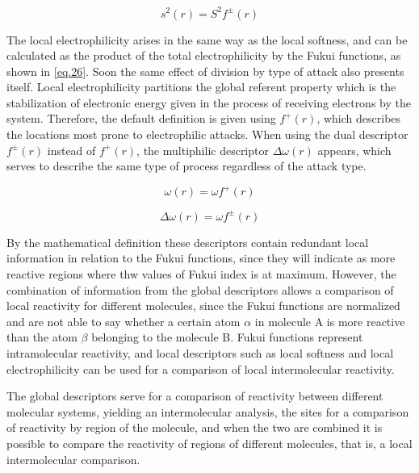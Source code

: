 \documentclass[a4paper,11pt]{refart}
\begin{document}
	\begin{equation}
	s^{2}(r) = S^2f^{\pm}(r)
	\label{eq.25}
	\end{equation}

	The local electrophilicity arises in the same way as the local softness, and can be calculated as the product of the total electrophilicity by the Fukui functions\cite{noorizadeh2013evaluation}, as shown in \autoref{eq.26}. Soon the same effect of division by type of attack also presents itself. Local electrophilicity partitions the global referent property which is the stabilization of electronic energy given in the process of receiving electrons by the system. Therefore, the default definition is given using $f^+(r)$, which describes the locations most prone to electrophilic attacks. When using the dual descriptor $f^{\pm}(r)$ instead of $f^+(r)$, the multiphilic descriptor $\Delta \omega(r)$ appears, which serves to describe the same type of process regardless of the attack type\cite{padmanabhan2007multiphilic}.

	\begin{equation}
	\omega(r) = \omega f^+(r)
	\label{eq.26}
	\end{equation}

	\begin{equation}
	\Delta \omega(r) = \omega f^{\pm}(r)
	\label{eq.27}
	\end{equation}

	By the mathematical definition these descriptors contain redundant local information in relation to the Fukui functions, since they will indicate as more reactive regions where thw values of Fukui index is at maximum. However, the combination of information from the global descriptors allows a comparison of local reactivity for different molecules, since the Fukui functions are normalized and are not able to say whether a certain atom $\alpha$ in molecule A is more reactive than the atom $\beta$ belonging to the molecule B\cite{Roy1998}. Fukui functions represent intramolecular reactivity, and local descriptors such as local softness and local electrophilicity can be used for a comparison of local intermolecular reactivity.

	The global descriptors serve for a comparison of reactivity between different molecular systems, yielding an intermolecular analysis, the sites for a comparison of reactivity by region of the molecule, and when the two are combined it is possible to compare the reactivity of regions of different molecules, that is, a local intermolecular comparison.
\end{document}
